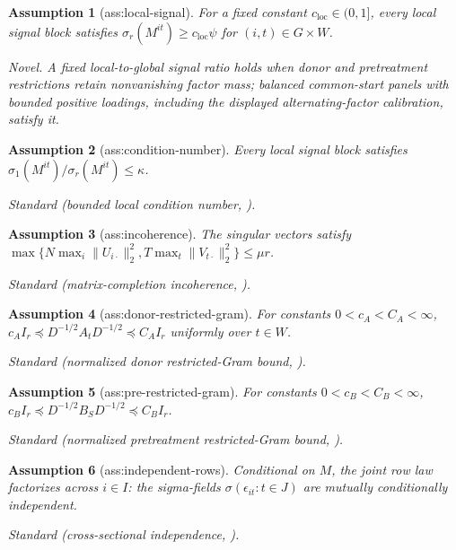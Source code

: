 \documentclass{article}
\newtheorem{assumption}{Assumption}
\begin{document}
\begin{assumption}[ass:local-signal]\label{ass:local-signal}
For a fixed constant \(c_{\mathrm{loc}}\in(0,1]\), every local signal block satisfies \(\sigma_r(M^{it})\ge c_{\mathrm{loc}}\psi\) for \((i,t)\in G\times W\).
\par\smallskip\noindent\emph{Novel.} A fixed local-to-global signal ratio holds when donor and pretreatment restrictions retain nonvanishing factor mass; balanced common-start panels with bounded positive loadings, including the displayed alternating-factor calibration, satisfy it.
\end{assumption}

\begin{assumption}[ass:condition-number]\label{ass:condition-number}
Every local signal block satisfies \(\sigma_1(M^{it})/\sigma_r(M^{it})\le\kappa\).
\par\smallskip\noindent\emph{Standard} (bounded local condition number, \cite{choiYuan2024MNAR}).
\end{assumption}

\begin{assumption}[ass:incoherence]\label{ass:incoherence}
The singular vectors satisfy \(\max\{N\max_i\|U_{i\cdot}\|_2^2,T\max_t\|V_{t\cdot}\|_2^2\}\le\mu r\).
\par\smallskip\noindent\emph{Standard} (matrix-completion incoherence, \cite{chenChiFanMaYan2020ConvexMC}).
\end{assumption}

\begin{assumption}[ass:donor-restricted-gram]\label{ass:donor-restricted-gram}
For constants \(0<c_A<C_A<\infty\), \(c_AI_r\preceq D^{-1/2}A_tD^{-1/2}\preceq C_AI_r\) uniformly over \(t\in W\).
\par\smallskip\noindent\emph{Standard} (normalized donor restricted-Gram bound, \cite{choiYuan2024MNAR}).
\end{assumption}

\begin{assumption}[ass:pre-restricted-gram]\label{ass:pre-restricted-gram}
For constants \(0<c_B<C_B<\infty\), \(c_BI_r\preceq D^{-1/2}B_SD^{-1/2}\preceq C_BI_r\).
\par\smallskip\noindent\emph{Standard} (normalized pretreatment restricted-Gram bound, \cite{choiYuan2024MNAR}).
\end{assumption}

\begin{assumption}[ass:independent-rows]\label{ass:independent-rows}
Conditional on \(M\), the joint row law factorizes across \(i\in I\): the sigma-fields \(\sigma(\epsilon_{it}:t\in J)\) are mutually conditionally independent.
\par\smallskip\noindent\emph{Standard} (cross-sectional independence, \cite{choiYuan2025WeakFactors}).
\end{assumption}
\end{document}
